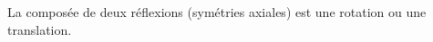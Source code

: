 La composée de deux réflexions (symétries axiales) est une rotation ou une translation.

\begin{reponses}
\end{reponses}

